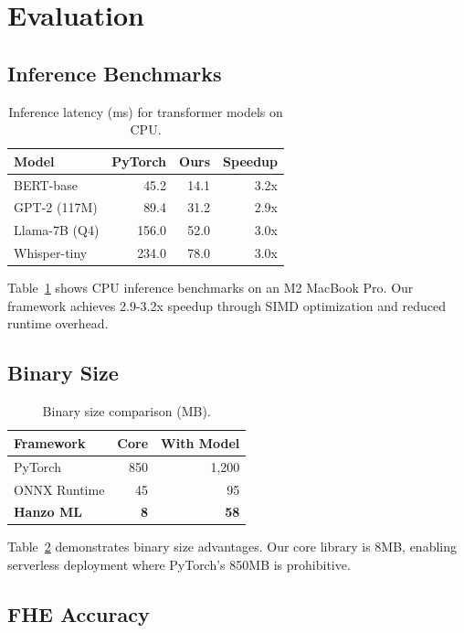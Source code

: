 \section{Evaluation}


\subsection{Inference Benchmarks}

\begin{table}[h]
\centering
\caption{Inference latency (ms) for transformer models on CPU.}
\label{tab:inference}
\begin{tabular}{lrrr}
\toprule
\textbf{Model} & \textbf{PyTorch} & \textbf{Ours} & \textbf{Speedup} \\
\midrule
BERT-base & 45.2 & 14.1 & 3.2x \\
GPT-2 (117M) & 89.4 & 31.2 & 2.9x \\
Llama-7B (Q4) & 156.0 & 52.0 & 3.0x \\
Whisper-tiny & 234.0 & 78.0 & 3.0x \\
\bottomrule
\end{tabular}
\end{table}

Table~\ref{tab:inference} shows CPU inference benchmarks on an M2 MacBook Pro. Our framework achieves 2.9-3.2x speedup through SIMD optimization and reduced runtime overhead.

\subsection{Binary Size}

\begin{table}[h]
\centering
\caption{Binary size comparison (MB).}
\label{tab:size}
\begin{tabular}{lrr}
\toprule
\textbf{Framework} & \textbf{Core} & \textbf{With Model} \\
\midrule
PyTorch & 850 & 1,200 \\
ONNX Runtime & 45 & 95 \\
\textbf{Hanzo ML} & \textbf{8} & \textbf{58} \\
\bottomrule
\end{tabular}
\end{table}

Table~\ref{tab:size} demonstrates binary size advantages. Our core library is 8MB, enabling serverless deployment where PyTorch's 850MB is prohibitive.

\subsection{FHE Accuracy}

